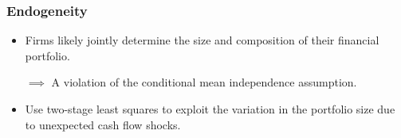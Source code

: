 \documentclass[handout]{beamer}
\begin{document}
\begin{frame}[label=endogeneity]
\frametitle{Endogeneity}

\begin{itemize}[<+->]
\item Firms likely jointly determine the size and composition of their financial portfolio.

\bigskip

$\implies$ A violation of the conditional mean independence assumption.

\bigskip

\item Use two-stage least squares to exploit the variation in the portfolio size due to unexpected cash flow shocks. \hyperlink{unexpected}{}
\end{itemize}

\end{frame}
\end{document}
